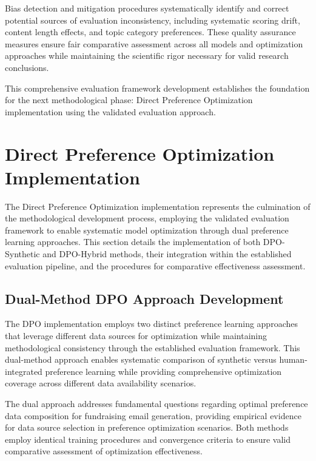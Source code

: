 Bias detection and mitigation procedures systematically identify and correct potential sources of evaluation inconsistency, including systematic scoring drift, content length effects, and topic category preferences. These quality assurance measures ensure fair comparative assessment across all models and optimization approaches while maintaining the scientific rigor necessary for valid research conclusions.

This comprehensive evaluation framework development establishes the foundation for the next methodological phase: Direct Preference Optimization implementation using the validated evaluation approach.

\section{Direct Preference Optimization Implementation}
\label{sec:dpo-implementation}

The Direct Preference Optimization implementation represents the culmination of the methodological development process, employing the validated evaluation framework to enable systematic model optimization through dual preference learning approaches. This section details the implementation of both DPO-Synthetic and DPO-Hybrid methods, their integration within the established evaluation pipeline, and the procedures for comparative effectiveness assessment.

\subsection{Dual-Method DPO Approach Development}

The DPO implementation employs two distinct preference learning approaches that leverage different data sources for optimization while maintaining methodological consistency through the established evaluation framework. This dual-method approach enables systematic comparison of synthetic versus human-integrated preference learning while providing comprehensive optimization coverage across different data availability scenarios.

The dual approach addresses fundamental questions regarding optimal preference data composition for fundraising email generation, providing empirical evidence for data source selection in preference optimization scenarios. Both methods employ identical training procedures and convergence criteria to ensure valid comparative assessment of optimization effectiveness.


